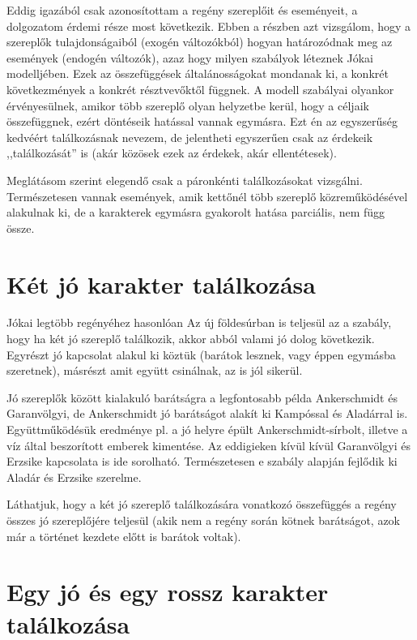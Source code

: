 \documentclass{thesis-ekf}
\begin{document}
    Eddig igazából csak azonosítottam a regény szereplőit és eseményeit, a dolgozatom érdemi része most következik.
    Ebben a részben azt vizsgálom, hogy a szereplők tulajdonságaiból (exogén változókból)
        hogyan határozódnak meg az események (endogén változók), azaz hogy milyen szabályok léteznek Jókai modelljében.
    Ezek az összefüggések általánosságokat mondanak ki, a konkrét következmények a konkrét résztvevőktől függnek.
    A modell szabályai olyankor érvényesülnek, amikor több szereplő olyan helyzetbe kerül, hogy a céljaik összefüggnek,
        ezért döntéseik hatással vannak egymásra.
    Ezt én az egyszerűség kedvéért találkozásnak nevezem, de jelentheti egyszerűen csak az érdekeik ,,találkozását'' is
        (akár közösek ezek az érdekek, akár ellentétesek).

    Meglátásom szerint elegendő csak a páronkénti találkozásokat vizsgálni.
    Természetesen vannak események, amik kettőnél több szereplő közreműködésével alakulnak ki,
        de a karakterek egymásra gyakorolt hatása parciális, nem függ össze.

    \section{Két jó karakter találkozása}\label{sec:ket-jo-karakter-talalkozasa}

    Jókai legtöbb regényéhez hasonlóan Az új földesúrban is teljesül az a szabály,
        hogy ha két jó szereplő találkozik, akkor abból valami jó dolog következik.
    Egyrészt jó kapcsolat alakul ki köztük (barátok lesznek, vagy éppen egymásba szeretnek),
        másrészt amit együtt csinálnak, az is jól sikerül.

    Jó szereplők között kialakuló barátságra a legfontosabb példa Ankerschmidt és Garanvölgyi,
        de Ankerschmidt jó barátságot alakít ki Kampóssal és Aladárral is.
    Együttműködésük eredménye pl. a jó helyre épült Ankerschmidt-sírbolt, illetve a víz által beszorított emberek kimentése.
    Az eddigieken kívül kívül Garanvölgyi és Erzsike kapcsolata is ide sorolható.
    Természetesen e szabály alapján fejlődik ki Aladár és Erzsike szerelme.

    Láthatjuk, hogy a két jó szereplő találkozására vonatkozó összefüggés a regény összes jó szereplőjére teljesül
        (akik nem a regény során kötnek barátságot, azok már a történet kezdete előtt is barátok voltak).

    \section{Egy jó és egy rossz karakter találkozása}\label{sec:egy-jo-es-egy-rossz-karakter-talalkozasa}
\end{document}
